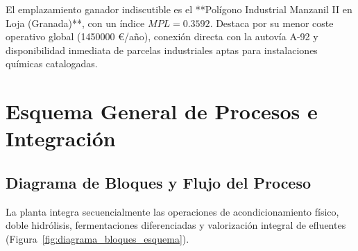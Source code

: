 \documentclass{report}
\begin{document}
\begin{table}[H]
    \centering
    \caption{Resultados del Método de Brown y Gibson para microlocalización.}
    \label{tab:brown_gibson}
\end{table}

\begin{tcolorbox}[colback=green!5!white,colframe=green!60!black,title=\textbf{Emplazamiento Industrial Seleccionado}]
    El emplazamiento ganador indiscutible es el **Polígono Industrial Manzanil II en Loja (Granada)**, con un índice $MPL = \mathbf{0.3592}$. Destaca por su menor coste operativo global (\num{1450000} €/año), conexión directa con la autovía A-92 y disponibilidad inmediata de parcelas industriales aptas para instalaciones químicas catalogadas.
\end{tcolorbox}

\chapter{Esquema General de Procesos e Integración}

\section{Diagrama de Bloques y Flujo del Proceso}
La planta integra secuencialmente las operaciones de acondicionamiento físico, doble hidrólisis, fermentaciones diferenciadas y valorización integral de efluentes (Figura~\ref{fig:diagrama_bloques_esquema}).
\end{document}
